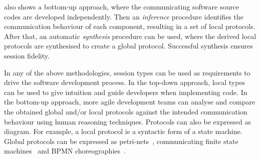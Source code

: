  also shows a bottom-up approach,
where the communicating software source codes are developed independently.
Then an {\em inference}  procedure identifies the communication behaviour
of each component, resulting in a set of local protocols.
After that, an automatic {\em synthesis} procedure can be used,
where the derived local protocols are synthesised
to create a global protocol. Successful synthesis
ensures session fidelity.


In any of the above methodologies, session types can be used as
requirements  to drive the software development process.
In the top-down approach, local types can be used to give intuition
and guide developers when implementing code.
In the bottom-up approach, more agile development teams
can analyse and compare the obtained global and/or local protocols
against the intended communication behaviour using human
reasoning techniques. Protocols can also be expressed
as diagram. For example, a local protocol is a syntactic form
of a state machine. Global protocols can be expressed as
petri-nets~\cite{DBLP:conf/tgc/FossatiHY14}, communicating
finite state machines~\cite{Denielou:2012:MST:2259248.2259258}
and BPMN choreographies~\cite{LTY2015}.







